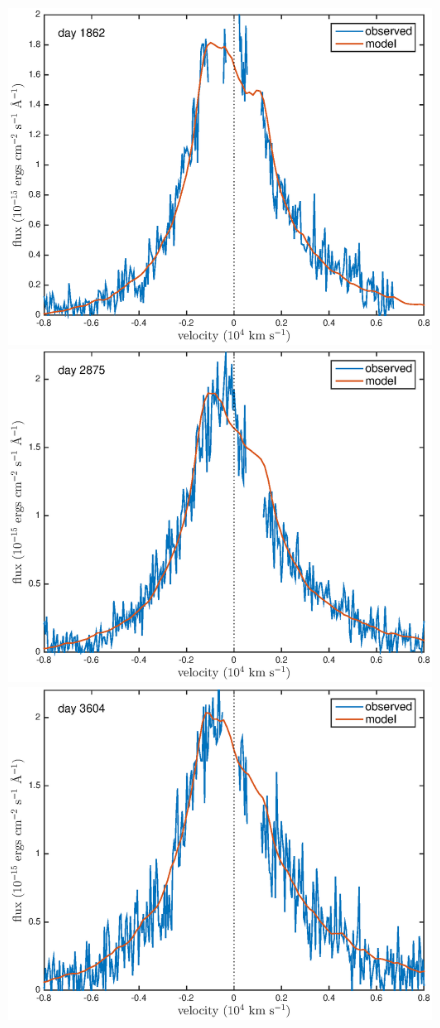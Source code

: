 \documentclass[useAMS,usenatbib,usegraphicx]{mnras}
\begin{document}
\begin{figure}
\begin{center}
\includegraphics[trim =33 10 45 15,clip=true,scale=0.35]{smooth/best_fit/d1862Ha}
\includegraphics[trim =55 10 45 15,clip=true,scale=0.35]{smooth/best_fit/d2875Ha}
\includegraphics[trim =55 10 45 15,clip=true,scale=0.35]{smooth/best_fit/d3604Ha}

\end{center}
\end{figure}
\end{document}
